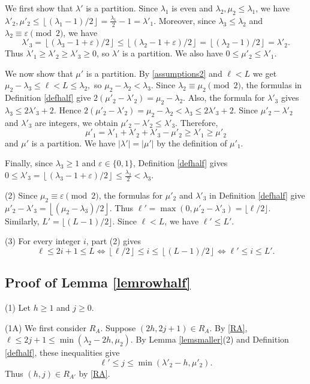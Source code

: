 \documentclass[11pt]{amsart}
\theoremstyle{remark}
\theoremstyle{definition}
\newcommand{\la}{\lambda}
\numberwithin{equation}{section}
\begin{document}
We first show that $\lambda'$ is a partition. Since $\la_1$ is even and
$\la_2,\mu_2\le\la_1$, we have
$
\la'_2,\mu'_2
\le\left\lfloor{(\la_1-1)}/{2}\right\rfloor
=\frac{\la_1}{2}-1=\la'_1.
$
Moreover, since $\la_3\le\la_2$ and
$\la_2\equiv\varepsilon\pmod2$, we have
\[
\la'_3
=\left\lfloor{(\la_3-1+\varepsilon)}/{2}\right\rfloor
\le\left\lfloor{(\la_2-1+\varepsilon)}/{2}\right\rfloor
=\left\lfloor{(\la_2-1)}/{2}\right\rfloor
=\la'_2.
\]
Thus $\la'_1\ge\la'_2\ge\la'_3\ge0$,
so $\la'$ is a partition. We also have
$0\le\mu'_2\le\la'_1$.

We now show that $\mu'$ is a partition. By \eqref{assumptions2} and $\ell<L$ we get
$
\mu_2-\la_3\le\ell<L\le\la_2,
$
so $\mu_2-\la_2<\la_3$.
Since $\la_2\equiv\mu_2\pmod2$, the formulas
in Definition \ref{defhalf} give
$
2(\mu'_2-\la'_2)=\mu_2-\la_2.
$
Also, the formula for $\la'_3$ gives
$\la_3\le2\la'_3+2$. Hence
$
2(\mu'_2-\la'_2)
=\mu_2-\la_2
<\la_3\le2\la'_3+2.
$
Since $\mu'_2-\la'_2$ and $\la'_3$ are integers,
we obtain
$\mu'_2-\la'_2\le\la'_3$.
Therefore,
\[
\mu'_1
=\la'_1+\la'_2+\la'_3-\mu'_2
\ge\la'_1\ge\mu'_2
\]
and $\mu'$ is a partition. We have
$|\la'|=|\mu'|$ by the definition of $\mu'_1$.

Finally, since $\la_3\ge1$ and
$\varepsilon\in\{0,1\}$, Definition \ref{defhalf}
gives
$
0\le\la'_3
=\left\lfloor{(\la_3-1+\varepsilon)}/{2}\right\rfloor
\le\frac{\la_3}{2}<\la_3.
$

(2) Since $\mu_2\equiv\varepsilon\pmod 2$, the formulas
for $\mu'_2$ and $\lambda'_3$ in Definition \ref{defhalf} give
$
\mu'_2-\lambda'_3
=\left\lfloor{(\mu_2-\lambda_3)}/{2}\right\rfloor.
$
Thus $\ell'=\max(0,\mu'_2-\lambda'_3)=\lfloor\ell/2\rfloor$.
Similarly, $L'=\lfloor(L-1)/2\rfloor$.
Since $\ell<L$, we have $\ell'\le L'$.

(3) For every integer $i$, part (2) gives
\[
\ell\le2i+1\le L
\iff
\left\lfloor{\ell}/{2}\right\rfloor
\le i\le
\left\lfloor{(L-1)}/{2}\right\rfloor
\iff
\ell'\le i\le L'.
\]

\subsection{Proof of Lemma \ref{lemrowhalf}}\label{proof34}
(1) Let $h\ge1$ and $j\ge0$.

(1A) We first consider $R_A$. Suppose $(2h,2j+1)\in R_A$. By \eqref{RA},
$
\ell\le2j+1\le\min(\la_2-2h,\mu_2).
$
By Lemma \ref{lemsmaller}(2) and
Definition \ref{defhalf}, these inequalities give
\begin{equation}\label{lem341}
\ell'\le j\le\min(\la'_2-h,\mu'_2).
\end{equation}
Thus $(h,j)\in R_{A'}$ by \eqref{RA}.
\end{document}
